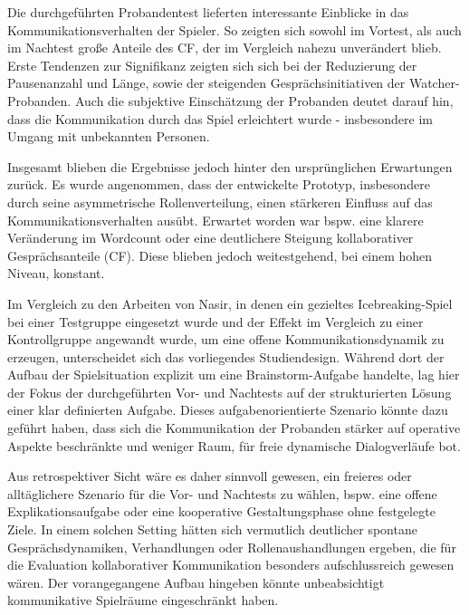 Die durchgeführten Probandentest lieferten interessante Einblicke in das Kommunikationsverhalten der Spieler. So zeigten sich sowohl im Vortest, als auch im Nachtest große Anteile des \ac{CF}, der im Vergleich nahezu unverändert blieb. Erste Tendenzen zur Signifikanz zeigten sich sich bei der Reduzierung der Pausenanzahl und Länge, sowie der steigenden Gesprächsinitiativen der Watcher-Probanden. Auch die subjektive Einschätzung der Probanden deutet darauf hin, dass die Kommunikation durch das Spiel erleichtert wurde - insbesondere im Umgang mit unbekannten Personen. 

Insgesamt blieben die Ergebnisse jedoch hinter den ursprünglichen Erwartungen zurück. Es wurde angenommen, dass der entwickelte Prototyp, insbesondere durch seine asymmetrische Rollenverteilung, einen stärkeren Einfluss auf das Kommunikationsverhalten ausübt. Erwartet worden war bspw. eine klarere Veränderung im Wordcount oder eine deutlichere Steigung kollaborativer Gesprächsanteile (\ac{CF}). Diese blieben jedoch weitestgehend, bei einem hohen Niveau, konstant.

Im Vergleich zu den Arbeiten von Nasir, in denen ein gezieltes Icebreaking-Spiel bei einer Testgruppe eingesetzt wurde und der Effekt im Vergleich zu einer Kontrollgruppe angewandt wurde, um eine offene Kommunikationsdynamik zu erzeugen, unterscheidet sich das vorliegendes Studiendesign. Während dort der Aufbau der Spielsituation explizit um eine Brainstorm-Aufgabe handelte, lag hier der Fokus der durchgeführten Vor- und Nachtests auf der strukturierten Lösung einer klar definierten Aufgabe. Dieses aufgabenorientierte Szenario könnte dazu geführt haben, dass sich die Kommunikation der Probanden stärker auf operative Aspekte beschränkte und weniger Raum, für freie dynamische Dialogverläufe bot. 

Aus retrospektiver Sicht wäre es daher sinnvoll gewesen, ein freieres oder alltäglichere Szenario für die Vor- und Nachtests zu wählen, bspw. eine offene Explikationsaufgabe oder eine kooperative Gestaltungsphase ohne festgelegte Ziele. In einem solchen Setting hätten sich vermutlich deutlicher spontane Gesprächsdynamiken, Verhandlungen oder Rollenaushandlungen ergeben, die für die Evaluation kollaborativer Kommunikation besonders aufschlussreich gewesen wären. Der vorangegangene Aufbau hingeben könnte unbeabsichtigt kommunikative Spielräume eingeschränkt haben.


